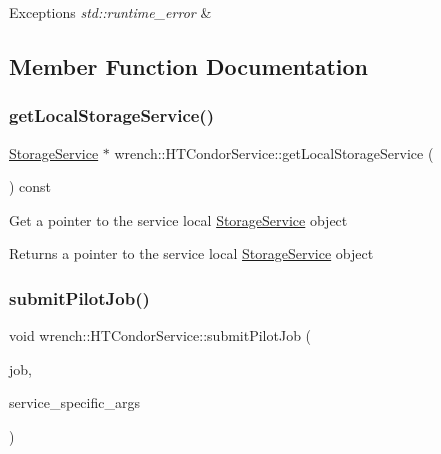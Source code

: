 \begin{DoxyExceptions}{Exceptions}
{\em std\+::runtime\+\_\+error} & \\
\hline
\end{DoxyExceptions}


\subsection{Member Function Documentation}
\mbox{\label{classwrench_1_1_h_t_condor_service_a4c8a4111afff9952e90d210a8b0bdf35}} 
\subsubsection{\texorpdfstring{get\+Local\+Storage\+Service()}{getLocalStorageService()}}
{\footnotesize\ttfamily \hyperlink{classwrench_1_1_storage_service}{Storage\+Service} $\ast$ wrench\+::\+H\+T\+Condor\+Service\+::get\+Local\+Storage\+Service (\begin{DoxyParamCaption}{ }\end{DoxyParamCaption}) const}

Get a pointer to the service local \hyperlink{classwrench_1_1_storage_service}{Storage\+Service} object \begin{DoxyReturn}{Returns}
a pointer to the service local \hyperlink{classwrench_1_1_storage_service}{Storage\+Service} object 
\end{DoxyReturn}
\mbox{\label{classwrench_1_1_h_t_condor_service_a1fac4517c82ac0b0737cd6ca75bba952}} 
\subsubsection{\texorpdfstring{submit\+Pilot\+Job()}{submitPilotJob()}}
{\footnotesize\ttfamily void wrench\+::\+H\+T\+Condor\+Service\+::submit\+Pilot\+Job (\begin{DoxyParamCaption}\item[{\hyperlink{classwrench_1_1_pilot_job}{Pilot\+Job} $\ast$}]{job,  }\item[{std\+::map$<$ std\+::string, std\+::string $>$ \&}]{service\+\_\+specific\+\_\+args }\end{DoxyParamCaption})\hspace{0.3cm}{\ttfamily [override]}}




